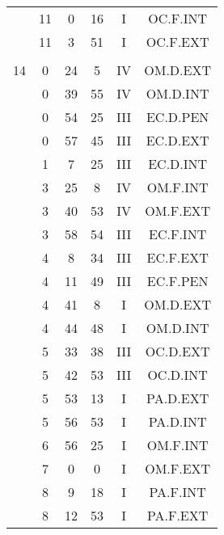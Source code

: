 \documentclass[12pt, a4paper]{article}
\begin{document}
\begin{multicols}{3}
{\begin{tabular}{c c c c c c}
	 	 	 	 & 11 & 0 & 16 & I & OC.F.INT\\%
	 	 	 	 & 11 & 3 & 51 & I & OC.F.EXT\\%
	 	 	 	 & & & & & \\%
	 	 	 	14 & 0 & 24 & 5 & IV & OM.D.EXT\\%
	 	 	 	 & 0 & 39 & 55 & IV & OM.D.INT\\%
	 	 	 	 & 0 & 54 & 25 & III & EC.D.PEN\\%
	 	 	 	 & 0 & 57 & 45 & III & EC.D.EXT\\%
	 	 	 	 & 1 & 7 & 25 & III & EC.D.INT\\%
	 	 	 	 & 3 & 25 & 8 & IV & OM.F.INT\\%
	 	 	 	 & 3 & 40 & 53 & IV & OM.F.EXT\\%
	 	 	 	 & 3 & 58 & 54 & III & EC.F.INT\\%
	 	 	 	 & 4 & 8 & 34 & III & EC.F.EXT\\%
	 	 	 	 & 4 & 11 & 49 & III & EC.F.PEN\\%
	 	 	 	 & 4 & 41 & 8 & I & OM.D.EXT\\%
	 	 	 	 & 4 & 44 & 48 & I & OM.D.INT\\%
	 	 	 	 & 5 & 33 & 38 & III & OC.D.EXT\\%
	 	 	 	 & 5 & 42 & 53 & III & OC.D.INT\\%
	 	 	 	 & 5 & 53 & 13 & I & PA.D.EXT\\%
	 	 	 	 & 5 & 56 & 53 & I & PA.D.INT\\%
	 	 	 	 & 6 & 56 & 25 & I & OM.F.INT\\%
	 	 	 	 & 7 & 0 & 0 & I & OM.F.EXT\\%
	 	 	 	 & 8 & 9 & 18 & I & PA.F.INT\\%
	 	 	 	 & 8 & 12 & 53 & I & PA.F.EXT\\%

\end{tabular}}
\end{multicols}
\end{document}
